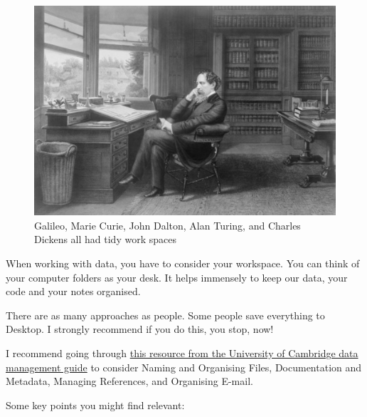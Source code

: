 \documentclass[
]{book}
\begin{document}
\begin{figure}
\includegraphics[width=6.94in]{imgs/charles_dickens_desk} \caption{\label{fig:figs}Galileo, Marie Curie, John Dalton, Alan Turing, and Charles Dickens all had tidy work spaces}\label{fig:unnamed-chunk-4}
\end{figure}

When working with data, you have to consider your workspace. You can think of your computer folders as your desk. It helps immensely to keep our data, your code and your notes organised.

There are as many approaches as people. Some people save everything to Desktop. I strongly recommend if you do this, you stop, now!

I recommend going through \href{https://www.data.cam.ac.uk/data-management-guide/organising-your-data}{this resource from the University of Cambridge data management guide} to consider Naming and Organising Files, Documentation and Metadata, Managing References, and Organising E-mail.

Some key points you might find relevant:
\end{document}
